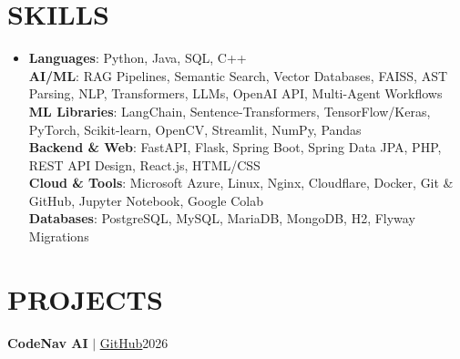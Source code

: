 \documentclass[letterpaper,10pt]{article}
\begin{document}


\section{SKILLS}
\begin{itemize}[leftmargin=0in, label={}, itemsep=-1pt]
  \small \item
    \textbf{Languages}: Python, Java, SQL, C++ \\
    \textbf{AI/ML}: RAG Pipelines, Semantic Search, Vector Databases, FAISS, AST Parsing, NLP, Transformers, LLMs, OpenAI API, Multi-Agent Workflows \\
    \textbf{ML Libraries}: LangChain, Sentence-Transformers, TensorFlow/Keras, PyTorch, Scikit-learn, OpenCV, Streamlit, NumPy, Pandas \\
    \textbf{Backend \& Web}: FastAPI, Flask, Spring Boot, Spring Data JPA, PHP, REST API Design, React.js, HTML/CSS \\
    \textbf{Cloud \& Tools}: Microsoft Azure, Linux, Nginx, Cloudflare, Docker, Git \& GitHub, Jupyter Notebook, Google Colab \\
    \textbf{Databases}: PostgreSQL, MySQL, MariaDB, MongoDB, H2, Flyway Migrations
\end{itemize}

\section{PROJECTS}
  \resumeSubHeadingListStart

    \resumeProjectHeading
      {\textbf{CodeNav AI} $|$ \href{https://github.com/uttkarsh-thakur26/codenav-ai}{\uline{GitHub}}}{2026}
      \resumeItemListStart
      \resumeItemListEnd
\end{document}

